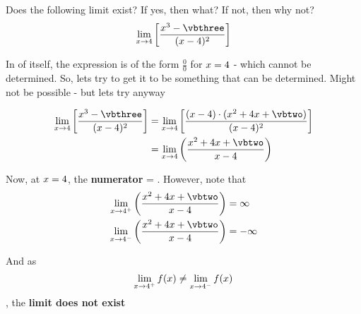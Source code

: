 

\SQUARE\vbone\vbtwo
\POWER{}\vbthree
\MULTIPLY{}\vbfour

\question[4] Does the following limit exist? If yes, then what? If not, then why not?
\[ \lim_{x\to\vbone}\left[ \dfrac{x^3-\vbthree}{(x-\vbone)^2}\right]\]

\watchout[-40pt]

\begin{solution}[\halfpage]
  In of itself, the expression is of the form $\frac{0}{0}$ for $x=4$ - which cannot be determined. So, lets try to get it to be something that can be determined. Might not be possible - but lets try anyway
  
  \begin{align}
    \lim_{x\to\vbone}\left[ \dfrac{x^3-\vbthree}{(x-\vbone)^2}\right] &= 
    \lim_{x\to\vbone}\left[ \dfrac{(x-\vbone)\cdot (x^2 + \vbone x + \vbtwo)}{(x-\vbone)^2}\right]\\
    &= \lim_{x\to\vbone}\left( \dfrac{x^2+\vbone x + \vbtwo}{x-\vbone}\right)
  \end{align}
  
  Now, at $x=4$, the \textbf{numerator} = \vbfour. However, note that 
  \begin{align}
    \lim_{x\to\vbone^+}\left( \dfrac{x^2+\vbone x + \vbtwo}{x-\vbone}\right) &= \infty \\
    \lim_{x\to\vbone^-}\left( \dfrac{x^2+\vbone x + \vbtwo}{x-\vbone}\right) &= -\infty
  \end{align}
  
  And as \[ \lim_{x\to4^+} f(x) \neq \lim_{x\to4^-} f(x)\], the \textbf{limit does not exist}
\end{solution}
